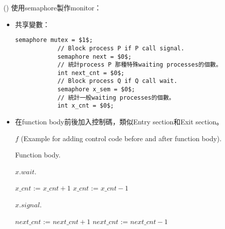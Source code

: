 \begin{theorem}{()} 使用semaphore製作monitor：\begin{itemize}
        \item 共享變數：\begin{lstlisting}[caption={Shared variables of making monitor using semaphore.}, captionpos=b, mathescape=true]
            semaphore mutex = $1$;
            // Block process P if P call signal. 
            semaphore next = $0$;
            // 統計process P 那種特殊waiting processes的個數。 
            int next_cnt = $0$;
            // Block process Q if Q call wait.
            semaphore x_sem = $0$;
            // 統計一般waiting processes的個數。
            int x_cnt = $0$; 
        \end{lstlisting}
        \item 在function body前後加入控制碼，類似Entry section和Exit section。
        \begin{algorithm}[H]
            \caption{$f$ (Example for adding control code before and after function body).}
            \begin{algorithmic}[1]
                    \State {}
                    \State Function body.
                        \State {}
                    \Else
                        \State {}
                    \EndIf
                \EndFunction
            \end{algorithmic}
        \end{algorithm}
        \begin{algorithm}[H]
            \caption{$x.wait$.}
            \begin{algorithmic}[1]
                    \State $x\_cnt$ := $x\_cnt + 1$
                        \State {}
                    \Else
                        \State {}
                    \EndIf
                    \State {} 
                    \State $x\_cnt$ := $x\_cnt - 1$ 
                \EndFunction
            \end{algorithmic}
        \end{algorithm}
        \begin{algorithm}[H]
            \caption{$x.signal$.}
            \begin{algorithmic}[1]
                        \State $next\_cnt$ := $next\_cnt + 1$
                        \State {}
                        \State {} 
                        \State $next\_cnt$ := $next\_cnt - 1$ 
                    \EndIf
                \EndFunction
            \end{algorithmic}
        \end{algorithm}
    \end{itemize}
\end{theorem}
